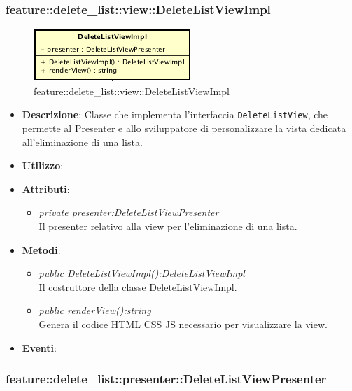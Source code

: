 \subsubsection{feature::delete_list::view::DeleteListViewImpl}

\label{feature::delete_list::view::DeleteListViewImpl}
\begin{figure}[ht]
	\centering
	\includegraphics[scale=0.5]{Sezioni/SottosezioniST/img/app/DeleteListViewImpl.png}
	\caption{feature::delete_list::view::DeleteListViewImpl}
\end{figure}

\begin{itemize}
\item \textbf{Descrizione}: Classe che implementa l'interfaccia \texttt{DeleteListView}, che permette al Presenter e allo sviluppatore di personalizzare la vista dedicata all'eliminazione di una lista.
\item \textbf{Utilizzo}:
\item \textbf{Attributi}: 
	\begin{itemize}
	\item \textit{private presenter:DeleteListViewPresenter}\\
		Il presenter relativo alla view per l'eliminazione di una lista.
	\end{itemize}
\item \textbf{Metodi}:
	\begin{itemize}
	\item \textit{public DeleteListViewImpl():DeleteListViewImpl}\\
	Il costruttore della classe DeleteListViewImpl.
	\item \textit{public renderView():string}\\
			Genera il codice HTML CSS JS necessario per visualizzare la view.
	\end{itemize}
\item \textbf{Eventi}:
\end{itemize}

\subsubsection{feature::delete\_list::presenter::DeleteListViewPresenter}

